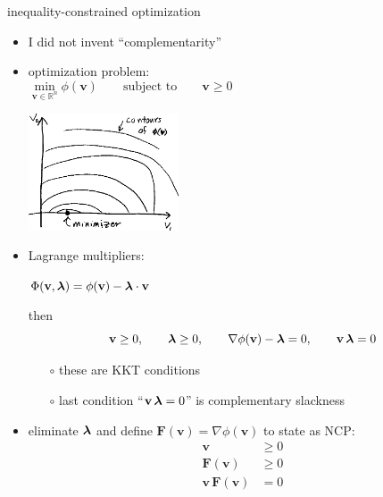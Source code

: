 \documentclass[10pt,hyperref,dvipsnames]{beamer}
\newcommand{\bv}{\mathbf{v}}
\newcommand{\bF}{\mathbf{F}}
\newcommand{\grad}{\nabla}
\newcommand{\RR}{\mathbb{R}}
\begin{document}
\begin{frame}{inequality-constrained optimization}
\begin{itemize}
\item I did not invent ``complementarity''
\item optimization problem:
    $$\min_{\bv\in\RR^n} \phi(\bv) \qquad \text{subject to} \qquad \bv \ge 0 \phantom{sd ad adsaf jsdlkja asdf kj asdf asdfa ad sdfa sad}$$

\vspace{-20mm}
\hfill \includegraphics[width=0.35\textwidth]{figs/optimization.png}

\vspace{-8mm}
\item Lagrange multipliers:

\smallskip
\qquad $\Phi(\bv,\blambda) = \phi(\bv) - \blambda \cdot \bv$

then
    $$\bv \ge 0, \qquad \blambda \ge 0, \qquad \grad \phi(\bv) - \blambda = 0, \qquad \bv\, \blambda = 0$$

    \begin{itemize}
    \item[$\circ$] these are KKT conditions
    \item[$\circ$] last condition ``$\bv\, \blambda = 0$'' is \alert{complementary slackness}
    \end{itemize}

\bigskip
\item eliminate $\bm{\lambda}$ and define $\bF(\bv) = \grad \phi(\bv)$ to state as \alert{NCP}:
\begin{align*}
\bv &\ge 0 \\
\bF(\bv) &\ge 0 \\
\bv\, \bF(\bv) &= 0
\end{align*}
\end{itemize}
\end{frame}
\end{document}
